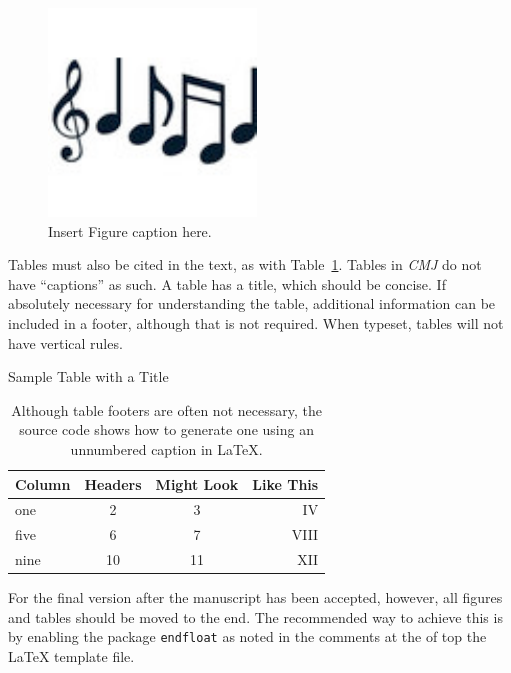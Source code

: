 \documentclass[letterpaper, 12pt]{article}
\begin{document}
\begin{figure}[]
\begin{center}
\includegraphics{myFigure}
\caption{Insert Figure caption here.}
\label{fig:myFigure}
\end{center}
\end{figure}

Tables must also be cited in the text, as with Table~\ref{tab:myTable}. Tables in \emph{CMJ} do not have ``captions'' as such. A table has a title, which should be concise. If absolutely necessary for understanding the table, additional information can be included in a footer, although that is not required. When typeset, tables will not have vertical rules.

\begin{table}[]
\caption{Sample Table with a Title}
\centering
\begin{tabular}{lccr}
  \hline
  \textbf{Column} & \textbf{Headers} & \textbf{Might Look} & \textbf{Like This}  \\
  \hline
  one & 2 & 3 & IV \\
  five & 6 & 7 & VIII \\
  nine & 10 & 11 & XII \\
   \hline
\end{tabular}
\caption*{\textnormal{{\small Although table footers are often not necessary, the source code shows how to generate one using an unnumbered caption in LaTeX.}}}
\label{tab:myTable}
\end{table}%


For the final version after the manuscript has been accepted, however, all figures and tables should be moved to the end.
The recommended way to achieve this is by enabling the package {\tt endfloat} as noted in the comments at the of top the LaTeX template file.
\end{document}
